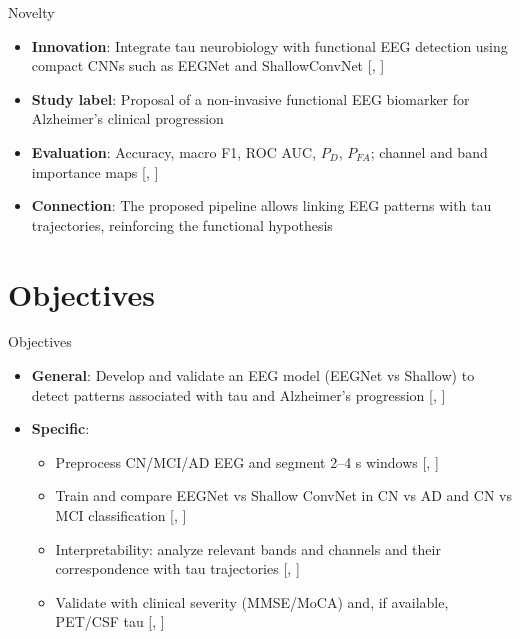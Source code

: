\documentclass{beamer}
\renewcommand{\parencite}[1]{[\citeauthor{#1}, \citeyear{#1}]}
\renewcommand{\cite}[1]{\parencite{#1}}
\begin{document}
\begin{frame}{Novelty}
\begin{itemize}
  \item \textbf{Innovation}: Integrate tau neurobiology with functional EEG detection using compact CNNs such as EEGNet and ShallowConvNet {\tiny\cite{Ajra2023,Lawhern2018}}
  \item \textbf{Study label}: Proposal of a non-invasive functional EEG biomarker for Alzheimer’s clinical progression
  \item \textbf{Evaluation}: Accuracy, macro F1, ROC AUC, \( P_D \), \( P_{FA} \); channel and band importance maps {\tiny\cite{Kay1998}}
  \item \textbf{Connection}: The proposed pipeline allows linking EEG patterns with tau trajectories, reinforcing the functional hypothesis
\end{itemize}
\end{frame}

\section{Objectives}
\begin{frame}{Objectives}
\begin{itemize}
  \item \textbf{General}: Develop and validate an EEG model (EEGNet vs Shallow) to detect patterns associated with tau and Alzheimer’s progression {\tiny\cite{Lawhern2018,Schirrmeister2017}}
  \item \textbf{Specific}:
    \begin{itemize}
      \item Preprocess CN/MCI/AD EEG and segment 2–4 s windows {\tiny\cite{Schirrmeister2017}}
      \item Train and compare EEGNet vs Shallow ConvNet in CN vs AD and CN vs MCI classification {\tiny\cite{Lawhern2018}}
      \item Interpretability: analyze relevant bands and channels and their correspondence with tau trajectories {\tiny\cite{Ajra2023}}
      \item Validate with clinical severity (MMSE/MoCA) and, if available, PET/CSF tau {\tiny\cite{dePaula2009}}
    \end{itemize}
\end{itemize}
\end{frame}
\end{document}
